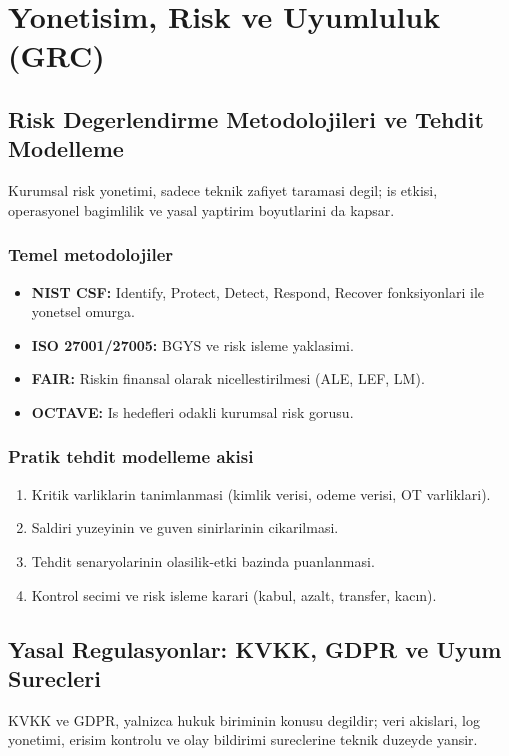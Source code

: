 
\section{Yonetisim, Risk ve Uyumluluk (GRC)}

\subsection{Risk Degerlendirme Metodolojileri ve Tehdit Modelleme}
Kurumsal risk yonetimi, sadece teknik zafiyet taramasi degil; is etkisi, operasyonel bagimlilik ve
yasal yaptirim boyutlarini da kapsar.

\subsubsection{Temel metodolojiler}
\begin{itemize}
    \item \textbf{NIST CSF:} Identify, Protect, Detect, Respond, Recover fonksiyonlari ile yonetsel omurga.
    \item \textbf{ISO 27001/27005:} BGYS ve risk isleme yaklasimi.
    \item \textbf{FAIR:} Riskin finansal olarak nicellestirilmesi (ALE, LEF, LM).
    \item \textbf{OCTAVE:} Is hedefleri odakli kurumsal risk gorusu.
\end{itemize}

\subsubsection{Pratik tehdit modelleme akisi}
\begin{enumerate}
    \item Kritik varliklarin tanimlanmasi (kimlik verisi, odeme verisi, OT varliklari).
    \item Saldiri yuzeyinin ve guven sinirlarinin cikarilmasi.
    \item Tehdit senaryolarinin olasilik-etki bazinda puanlanmasi.
    \item Kontrol secimi ve risk isleme karari (kabul, azalt, transfer, kacın).
\end{enumerate}

\subsection{Yasal Regulasyonlar: KVKK, GDPR ve Uyum Surecleri}
KVKK ve GDPR, yalnizca hukuk biriminin konusu degildir; veri akislari, log yonetimi, erisim kontrolu ve
olay bildirimi sureclerine teknik duzeyde yansir.

